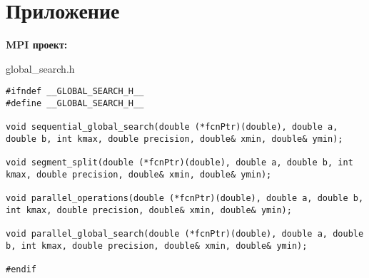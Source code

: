 \documentclass{report}
\begin{document}
\section*{Приложение}
\textbf{MPI проект:}

global\_search.h
\begin{lstlisting}
#ifndef __GLOBAL_SEARCH_H__
#define __GLOBAL_SEARCH_H__

void sequential_global_search(double (*fcnPtr)(double), double a, double b, int kmax, double precision, double& xmin, double& ymin);

void segment_split(double (*fcnPtr)(double), double a, double b, int kmax, double precision, double& xmin, double& ymin);

void parallel_operations(double (*fcnPtr)(double), double a, double b, int kmax, double precision, double& xmin, double& ymin);

void parallel_global_search(double (*fcnPtr)(double), double a, double b, int kmax, double precision, double& xmin, double& ymin);

#endif
\end{lstlisting}
\end{document}
